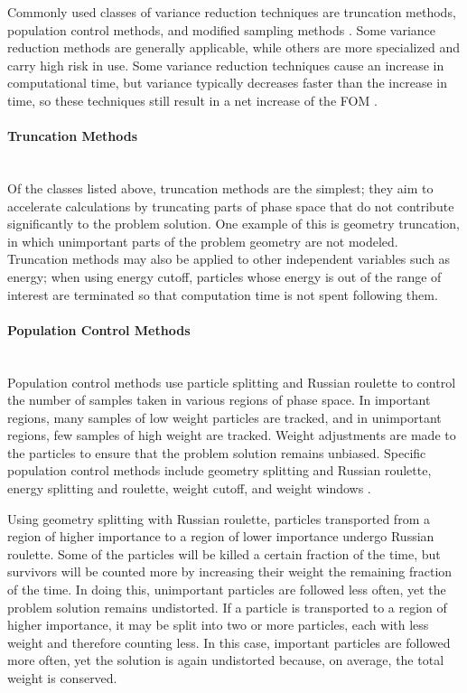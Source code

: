 Commonly used classes of variance reduction techniques are truncation methods,
population control methods, and modified sampling methods \cite{mcnp}.
Some variance reduction methods are generally applicable, while others are more 
specialized and carry high risk in use. Some variance reduction techniques cause an 
increase in computational time, but variance typically decreases faster than 
the increase in time, so these techniques still result in a net increase of the FOM
\cite{olsher}.

\paragraph{Truncation Methods}\mbox{} \\

Of the classes listed above, truncation methods are the simplest; they aim to 
accelerate
calculations by truncating parts of phase space that do not contribute significantly 
to the problem solution. One example of this is geometry truncation, in which 
unimportant parts of the problem geometry are not modeled. Truncation methods may 
also be applied to other independent variables such as energy; when using
energy cutoff, particles whose energy is out of the range of interest are terminated 
so that computation time is not spent following them.

\paragraph{Population Control Methods}\mbox{} \\

Population control methods use particle splitting and Russian roulette to control the 
number of samples taken in various regions of phase space. In important regions, many
samples of low weight particles are tracked, and in unimportant regions, few samples 
of high weight are tracked. Weight adjustments are made to the particles to ensure 
that the problem solution remains unbiased. Specific population control methods 
include geometry splitting and Russian roulette, energy splitting and roulette, 
weight cutoff, and weight windows \cite{mcnp}.

Using geometry splitting with Russian roulette, particles transported from a region 
of higher importance to a region of lower importance undergo Russian roulette. Some 
of the particles will be killed a certain fraction of the time, but survivors will be 
counted more by increasing their weight the remaining fraction of the time. In doing
this, unimportant particles are followed less often, yet the problem solution remains 
undistorted. If a particle is transported to a region of higher importance, it may be 
split into two or more particles, each with less weight and therefore counting less. 
In this case, important particles are followed more often, yet the solution is again 
undistorted because, on average, the total weight is conserved.

